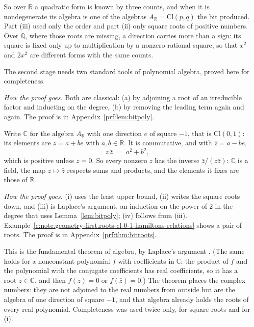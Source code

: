 \documentclass[11pt]{article}
\theoremstyle{definition}
\theoremstyle{plain}
\providecommand{\C}{}\renewcommand{\C}{\mathbb{C}}
\providecommand{\Cl}{}\renewcommand{\Cl}{\mathrm{Cl}}
\providecommand{\Q}{}\renewcommand{\Q}{\mathbb{Q}}
\providecommand{\R}{}\renewcommand{\R}{\mathbb{R}}
\begin{document}
So over $\R$ a quadratic form is known by three counts, and when it is nondegenerate its algebra is one of the algebras $A_{\R} = \Cl(p,q)$ the bit produced. Part (iii) used only the order and part (ii) only square roots of positive numbers. Over $\Q$, where those roots are missing, a direction carries more than a sign: its square is fixed only up to multiplication by a nonzero rational square, so that $x^{2}$ and $2x^{2}$ are different forms with the same counts.

The second stage needs two standard tools of polynomial algebra, proved here for completeness.

\label{c:note.geometry-first.setting-completion-number-systems-inside-3}
\noindent\emph{How the proof goes.} Both are classical: (a) by adjoining a root of an irreducible factor and inducting on the degree, (b) by removing the leading term again and again. The proof is in Appendix~\ref{prf:lem:bitpoly}.

Write $\C$ for the algebra $A_{\R}$ with one direction $e$ of square $-1$, that is $\Cl(0,1)$: its elements are $z = a + be$ with $a, b \in \R$. It is commutative, and with $\bar{z} = a - be$,
\[
z\,\bar{z} \;=\; a^{2} + b^{2} ,
\]
which is positive unless $z = 0$. So every nonzero $z$ has the inverse $\bar{z}/(z\bar{z})$: $\C$ is a field, the map $z \mapsto \bar{z}$ respects sums and products, and the elements it fixes are those of $\R$.

\label{c:note.geometry-first.setting-completion-number-systems-inside-4}
\noindent\emph{How the proof goes.} (i) uses the least upper bound, (ii) writes the square roots down, and (iii) is Laplace's argument, an induction on the power of $2$ in the degree that uses Lemma~\ref{lem:bitpoly}; (iv) follows from (iii). Example~\ref{c:note.geometry-first.roots-cl-0-1-hamiltons-relations} shows a pair of roots. The proof is in Appendix~\ref{prf:thm:bitroots}.

This is the fundamental theorem of algebra, by Laplace's argument \cite{Ebbinghaus1991}. (The same holds for a nonconstant polynomial $f$ with coefficients in $\C$: the product of $f$ and the polynomial with the conjugate coefficients has real coefficients, so it has a root $z \in \C$, and then $f(z) = 0$ or $f(\bar{z}) = 0$.) The theorem places the complex numbers: they are not adjoined to the real numbers from outside but are the algebra of one direction of square $-1$, and that algebra already holds the roots of every real polynomial. Completeness was used twice only, for square roots and for (i).
\end{document}

